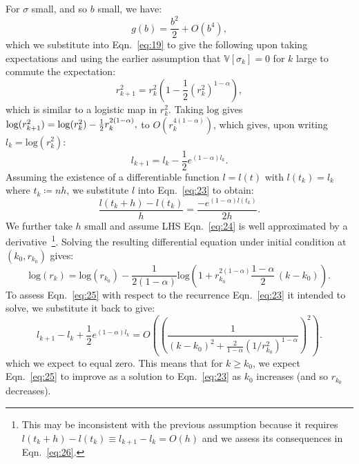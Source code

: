 \documentclass[twocolumn,
 reprint,
 amsmath,amssymb,
 aps,
 floatfix,
superscriptaddress
]{revtex4-1}
\begin{document}
For $\sigma$ small, and so $b$ small, we have:
\begin{equation}\label{eq:20}
g(b)=\frac{b^{2}}{2}+O(b^{4}),
\end{equation}
which we substitute into Eqn.~\ref{eq:19} to give the following upon taking
expectations and using the earlier assumption that $\mathbb{V}[\sigma_{k}]=0$ for $k$ large to commute the expectation:
\begin{equation}\label{eq:21}
r_{k+1}^{2}=r_{k}^{2}(1-\frac{1}{2}(r_{k}^{2})^{1-\alpha}),
\end{equation}
which is similar to a logistic map in $r_{k}^2$. Taking $\text{log}$ gives $\text{\text{log}}(r_{k+1}^2)=\log(r_{k}^2)-\frac{1}{2}r_{k}^{2(1-\alpha)},$ to $O(r_{k}^{4(1-\alpha)})$, which gives, upon writing $l_{k}=\text{log}(r_{k}^2)$:
\begin{equation}\label{eq:23}
l_{k+1}=l_{k}-\frac{1}{2}e^{(1-\alpha)l_{k}}.
\end{equation}
Assuming the existence of a differentiable function $l=l(t)$ with $l(t_{k})=l_{k}$
where $t_{k}\coloneqq nh$, we substitute $l$ into Eqn.~\ref{eq:23} to
obtain:
\begin{equation}\label{eq:24}
\frac{l(t_{k}+h)-l(t_{k})}{h}=\frac{-e^{(1-\alpha)l(t_{k})}}{2h}.
\end{equation}
We further take  $h$  small and assume LHS Eqn.~\ref{eq:24} is well approximated
by a derivative~\footnote{This may be inconsistent with the previous assumption
because it requires $l(t_{k}+h)-l(t_{k})\equiv l_{k+1}-l_{k}=O(h)$
and we assess its consequences in Eqn.~\ref{eq:26}.}. Solving the resulting differential equation under initial condition at $(k_{0},r_{k_{0}})$ gives:
\begin{equation}\label{eq:25}
\text{log}(r_{k})=\text{log}(r_{k_{0}})-\frac{1}{2(1-\alpha)}\text{log}(1+r_{k_{0}}^{2(1-\alpha)}\frac{1-\alpha}{2}\,(k-k_{0})).
\end{equation}
To assess Eqn.~\ref{eq:25} with respect to the recurrence Eqn.~\ref{eq:23} it
intended to solve, we substitute it back to give:
\begin{equation}\label{eq:26}
l_{k+1}-l_{k}+\frac{1}{2}e^{(1-\alpha)l_{k}}=O((\frac{1}{(k-k_{0})^{2}+\frac{2}{1-\alpha}(1/r_{k_{0}}^{2})^{1-\alpha}})^{2}).
\end{equation}
which we expect to equal zero. This means that for $k\geq k_{0}$, we expect Eqn.~\ref{eq:25} to improve
as a solution to Eqn.~\ref{eq:23} as $k_{0}$ increases (and so $r_{k_{0}}$
decreases).
\end{document}
